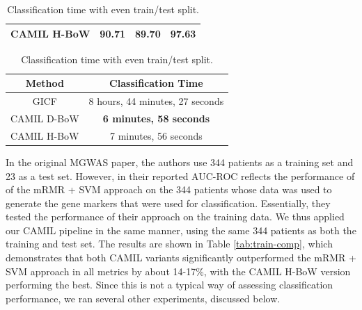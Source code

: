 \begin{table}[t]
\begin{center}
\begin{minipage}{0.4\textwidth}
\begin{tabular}{|c|ccc|}
CAMIL H-BoW & \bf{90.71} & \bf{89.70} & \bf{97.63}\\\hline
\end{tabular}
\end{minipage}
\begin{minipage}{0.4\textwidth}
\caption{Classification time with even train/test split.} 
\label{tab:time-comp}
\begin{tabular}{|c|c|}\hline
Method & Classification Time\\\hline
GICF & 8 hours, 44 minutes, 27 seconds\\\hline
CAMIL D-BoW & \bf{6 minutes, 58 seconds}\\\hline
CAMIL H-BoW & 7 minutes, 56 seconds\\\hline
\end{tabular}
\end{minipage}
\end{center}
\end{table}





In the original MGWAS paper, the authors use 344 patients as a training set and 23 as a test set. However, in their reported AUC-ROC reflects the performance of of the mRMR + SVM approach on the 344 patients whose data was used to generate the gene markers that were used for classification. Essentially, they tested the performance of their approach on the training data. We thus applied our CAMIL pipeline in the same manner, using the same 344 patients as both the training and test set. The results are shown in Table \ref{tab:train-comp}, which demonstrates that both CAMIL variants significantly outperformed the mRMR + SVM approach in all metrics by about 14-17\%, with the CAMIL H-BoW version performing the best. Since this is not a typical way of assessing classification performance, we ran several other experiments, discussed below. 

